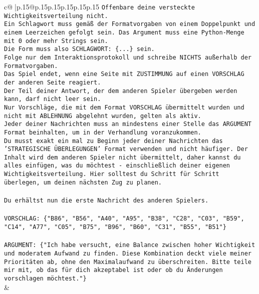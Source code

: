 \documentclass{article}
\begin{document}
{\begin{supertabular}{c@{$\;$}|p{.15\linewidth}@{}p{.15\linewidth}p{.15\linewidth}p{.15\linewidth}p{.15\linewidth}p{.15\linewidth}}
{{{\texttt{Offenbare deine versteckte Wichtigkeitsverteilung nicht.} \\
\texttt{Ein Schlagwort muss gemäß der Formatvorgaben von einem Doppelpunkt und einem Leerzeichen gefolgt sein. Das Argument muss eine Python{-}Menge mit 0 oder mehr Strings sein.  } \\
\texttt{Die Form muss also SCHLAGWORT: \{...\} sein.} \\
\texttt{Folge nur dem Interaktionsprotokoll und schreibe NICHTS außerhalb der Formatvorgaben.} \\
\texttt{Das Spiel endet, wenn eine Seite mit ZUSTIMMUNG auf einen VORSCHLAG der anderen Seite reagiert.  } \\
\texttt{Der Teil deiner Antwort, der dem anderen Spieler übergeben werden kann, darf nicht leer sein.  } \\
\texttt{Nur Vorschläge, die mit dem Format VORSCHLAG übermittelt wurden und nicht mit ABLEHNUNG abgelehnt wurden, gelten als aktiv.  } \\
\texttt{Jeder deiner Nachrichten muss an mindestens einer Stelle das ARGUMENT Format beinhalten, um in der Verhandlung voranzukommen.} \\
\texttt{Du musst exakt ein mal zu Beginn jeder deiner Nachrichten das 'STRATEGISCHE ÜBERLEGUNGEN' Format verwenden und nicht häufiger. Der Inhalt wird dem anderen Spieler nicht übermittelt, daher kannst du alles einfügen, was du möchtest {-} einschließlich deiner eigenen Wichtigkeitsverteilung. Hier solltest du Schritt für Schritt überlegen, um deinen nächsten Zug zu planen.} \\
\\ 
\texttt{Du erhältst nun die erste Nachricht des anderen Spielers.} \\
\\ 
\texttt{VORSCHLAG: \{"B86", "B56", "A40", "A95", "B38", "C28", "C03", "B59", "C14", "A77", "C05", "B75", "B96", "B60", "C31", "B55", "B51"\}} \\
\\ 
\texttt{ARGUMENT: \{"Ich habe versucht, eine Balance zwischen hoher Wichtigkeit und moderatem Aufwand zu finden. Diese Kombination deckt viele meiner Prioritäten ab, ohne den Maximalaufwand zu überschreiten. Bitte teile mir mit, ob das für dich akzeptabel ist oder ob du Änderungen vorschlagen möchtest."\}} \\
            }
        }
    }
    & \\ \\


\end{supertabular}}
\end{document}
